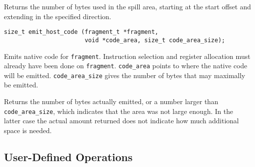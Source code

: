\documentclass{article}
\newcommand{\cc}[1]{\texttt{#1}} %
\begin{document}
Returns the number of bytes used in the spill area, starting at the
start offset and extending in the specified direction.

\begin{verbatim}
size_t emit_host_code (fragment_t *fragment,
                       void *code_area, size_t code_area_size);
\end{verbatim}

Emits native code for \cc{fragment}.  Instruction selection and
register allocation must already have been done on \cc{fragment}.
\cc{code\_area} points to where the native code will be emitted.
\cc{code\_area\_size} gives the number of bytes that may maximally
be emitted.

Returns the number of bytes actually emitted, or a number larger than
\cc{code\_area\_size}, which indicates that the area was not large
enough.  In the latter case the actual amount returned does not
indicate how much additional space is needed.

\subsection{User-Defined Operations}

\begingroup
\setlength{\parindent}{0pt}\setlength{\parskip}{2ex}
\renewcommand{\enotesize}{\normalsize}
\theendnotes\endgroup
\end{document}
